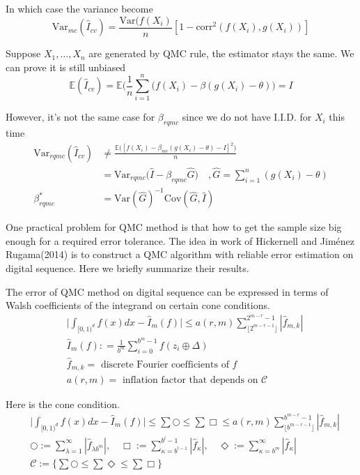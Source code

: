 In which case the variance become
\[
\mathrm{Var}_{mc}(\hat{I}_{cv})= \frac{\mathrm{Var}(f(X_i)}{n}[1-\mathrm{corr}^2(f(X_i), g(X_i))]
\]


Suppose $X_1, \dots, X_n$ are generated by QMC rule, the estimator stays the same.
We can prove it is still unbiased
\[
\mathbb{E}(\hat{I}_{cv})=\mathbb{E}\Big(\frac{1}{n}\sum_{i=1}^{n}\Big( f(X_i)-\beta(g(X_i)-\theta)\Big)=I 
\]

However, it's not the same case for $\beta_{rqmc}$ since we do not have I.I.D. for $X_i$ this time
\begin{align*}
\mathrm{Var}_{rqmc}(\hat{I}_{cv}) &\not= \frac{\mathbb{E}\big([f(X_i)-\beta_{mc}(g(X_i)-\theta)-I]^2 \big)}{n}\\
&=\mathrm{Var}_{rqmc}\Big( \hat{I}- \beta_{rqmc}\hat{G}\Big)\quad , \hat{G}=\sum_{i=1}^{n}(g(X_i)-\theta)\\
\beta_{rqmc}^*&= \mathrm{Var} (\hat{G})^{-1}\mathrm{Cov} (\hat{G}, \hat{I})
\end{align*}



One practical problem for QMC method is that how to get the sample size big enough for a required error tolerance. The idea in work of Hickernell and Jiménez Rugama(2014) is to construct a QMC algorithm with reliable error estimation on digital sequence. Here we briefly summarize their results.

The error of QMC method on digital sequence can be expressed in terms of Walsh coefficients of the integrand on certain cone conditions. 
\begin{align*}
&\Big|\int_{[0,1)^d}f(x)dx - \hat{I}_m(f)\Big| \leq a(r,m) \sum_{\lfloor 2^{m-r-1} \rfloor}^{2^{m-r}-1} |\hat{f}_{m,k}|\\
&\hat{I}_m(f): = \frac{1}{b^m}\sum_{i=0}^{b^m-1}f(z_i\oplus \Delta)\\
&\hat{f}_{m,k}=\text{ discrete Fourier coefficients of }f\\
&a(r,m) =\text{ inflation factor that depends on } \mathcal{C}
\end{align*}

Here is the cone condition.
\begin{align*}
	&\Big|\int_{[0,1)^d}f(x)dx - \hat{I}_m(f)\Big|
    \leq \sum {\bigcirc} 
	\leq \sum {\Box}
	\leq a(r,m) \sum_{\lfloor b^{m-r-1} \rfloor}^{b^{m-r}-1}|\hat{f}_{m,k}|\\
    &\bigcirc:= \sum_{\lambda=1}^{\infty}| \hat{f}_{\lambda b^m}|,\quad  
    \Box:= \sum_{\kappa=b^{l-1}}^{b^l-1}|\hat{f}_\kappa|,\quad
    \Diamond:=\sum_{\kappa=b^m}^{\infty}|\hat{f}_{\kappa}|\\
    &\mathcal{C}:=\Big\{\sum{\bigcirc} \leq \sum{\Diamond} \leq \sum{\Box}\Big\}
\end{align*}

